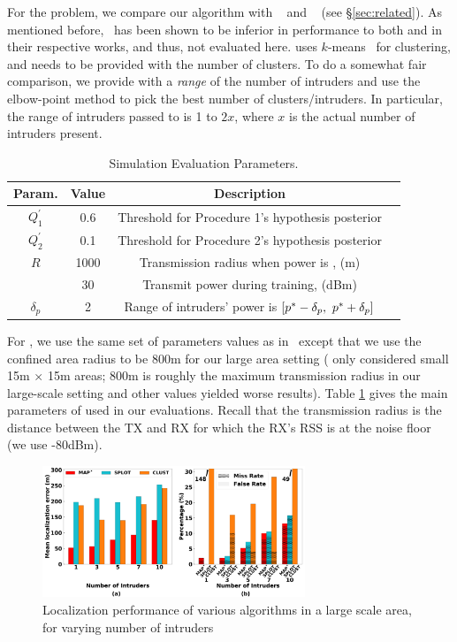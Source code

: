   For the \mtl problem, we compare our
\ouralgo algorithm with \splot~\cite{mobicom17-splot} and
\cl~\cite{clustering} (see \S\ref{sec:related}). As mentioned
before,~\cite{Quasi-EM} has been shown to be inferior in performance
to both \splot and \cl in their respective works, and thus, not
evaluated here.
\cl uses $k$-means~\cite{scikit-learn} for clustering, and needs to be
provided with the number of clusters. To do a somewhat fair
comparison, we provide \cl with a {\em range} of the number of
intruders and use the elbow-point method to pick the best
number of clusters/intruders. In particular, the range of intruders
passed to \cl is 1 to $2x$, where $x$ is the actual number of
intruders present.
\begin{table}[ht]
	\caption{Simulation Evaluation Parameters.}
	\centering
	\begin{tabular}{c c c c}
		\hline\hline
		Param. & Value & Description \\ [0.5ex]
		\hline
		$Q^{'}_{1}$ &  0.6   & Threshold for Procedure 1's hypothesis posterior\\ 
		$Q^{'}_{2}$ &  0.1   & Threshold for Procedure 2's hypothesis posterior\\
		$R$  & 1000 & Transmission radius when power is \pstar, (m) \\
		\pstar & 30  & Transmit power during training, (dBm) \\
		$\delta_p$ & 2  & Range of intruders' power is $[p^* - \delta_p, \ p^* + \delta_p]$\\
		\hline
	\end{tabular}
	\label{table:paramaters}
\end{table}

For \splot, we use the same set of parameters values as
in~\cite{mobicom17-splot} except that we use the confined area radius
to be 800m for our large area setting (\cite{mobicom17-splot} only
considered small 15m $\times$ 15m areas; 800m is roughly the maximum
transmission radius in our large-scale setting and other values
yielded worse results).
Table \ref{table:paramaters} gives the main parameters of \ouralgo
used in our evaluations. Recall that the transmission radius is the
distance between the TX and RX for which the RX's RSS is at the noise
floor (we use -80dBm). 

\begin{figure}[ht]
	\centering
	\includegraphics[width=0.7\textwidth]{chapters/ipsn/figures/splat-vary-numintru.png}
	\caption{Localization performance of various algorithms in a large scale area, for varying number of intruders}
	\label{fig:varying-num-intruders}
\end{figure}

